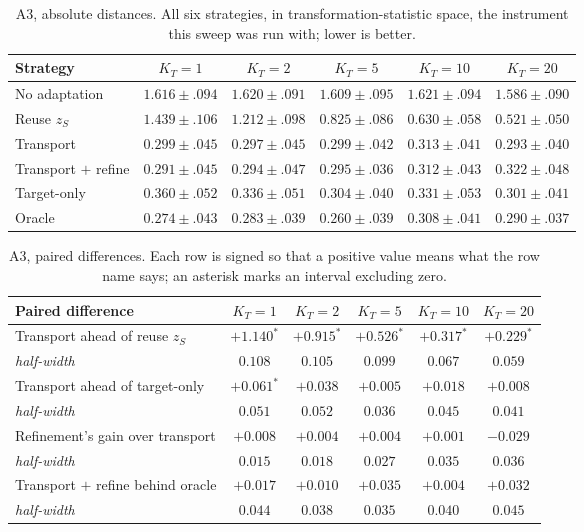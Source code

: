 \documentclass{article}
\begin{document}
\begin{table}[h]
\centering
\small
\begin{tabular}{lccccc}
\toprule
Strategy & $K_T=1$ & $K_T=2$ & $K_T=5$ & $K_T=10$ & $K_T=20$\\
\midrule
No adaptation & $1.616 \pm .094$ & $1.620 \pm .091$ & $1.609 \pm .095$ & $1.621 \pm .094$ & $1.586 \pm .090$\\
Reuse $z_S$ & $1.439 \pm .106$ & $1.212 \pm .098$ & $0.825 \pm .086$ & $0.630 \pm .058$ & $0.521 \pm .050$\\
Transport & $0.299 \pm .045$ & $0.297 \pm .045$ & $0.299 \pm .042$ & $0.313 \pm .041$ & $0.293 \pm .040$\\
Transport $+$ refine & $0.291 \pm .045$ & $0.294 \pm .047$ & $0.295 \pm .036$ & $0.312 \pm .043$ & $0.322 \pm .048$\\
Target-only & $0.360 \pm .052$ & $0.336 \pm .051$ & $0.304 \pm .040$ & $0.331 \pm .053$ & $0.301 \pm .041$\\
Oracle & $0.274 \pm .043$ & $0.283 \pm .039$ & $0.260 \pm .039$ & $0.308 \pm .041$ & $0.290 \pm .037$\\
\bottomrule
\end{tabular}
\caption{A3, absolute distances. All six strategies, in transformation-statistic space, the
instrument this sweep was run with; lower is better.}
\end{table}

\begin{table}[h]
\centering
\small
\begin{tabular}{lccccc}
\toprule
Paired difference & $K_T=1$ & $K_T=2$ & $K_T=5$ & $K_T=10$ & $K_T=20$\\
\midrule
Transport ahead of reuse $z_S$ & $+1.140^{*}$ & $+0.915^{*}$ & $+0.526^{*}$ & $+0.317^{*}$ & $+0.229^{*}$\\
\emph{half-width} & $0.108$ & $0.105$ & $0.099$ & $0.067$ & $0.059$\\
\midrule
Transport ahead of target-only & $+0.061^{*}$ & $+0.038$ & $+0.005$ & $+0.018$ & $+0.008$\\
\emph{half-width} & $0.051$ & $0.052$ & $0.036$ & $0.045$ & $0.041$\\
\midrule
Refinement's gain over transport & $+0.008$ & $+0.004$ & $+0.004$ & $+0.001$ & $-0.029$\\
\emph{half-width} & $0.015$ & $0.018$ & $0.027$ & $0.035$ & $0.036$\\
\midrule
Transport $+$ refine behind oracle & $+0.017$ & $+0.010$ & $+0.035$ & $+0.004$ & $+0.032$\\
\emph{half-width} & $0.044$ & $0.038$ & $0.035$ & $0.040$ & $0.045$\\
\bottomrule
\end{tabular}
\caption{A3, paired differences. Each row is signed so that a positive value means what the
row name says; an asterisk marks an interval excluding zero.}
\end{table}
\end{document}
